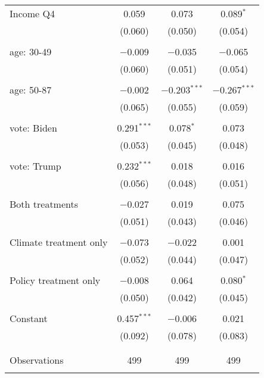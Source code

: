 \begin{tabular}{@{\extracolsep{5pt}}lccc}
 Income Q4 & 0.059 & 0.073 & 0.089$^{*}$ \\ 
  & (0.060) & (0.050) & (0.054) \\ 
  & & & \\ 
 age: 30-49 & $-$0.009 & $-$0.035 & $-$0.065 \\ 
  & (0.060) & (0.051) & (0.054) \\ 
  & & & \\ 
 age: 50-87 & $-$0.002 & $-$0.203$^{***}$ & $-$0.267$^{***}$ \\ 
  & (0.065) & (0.055) & (0.059) \\ 
  & & & \\ 
 vote: Biden & 0.291$^{***}$ & 0.078$^{*}$ & 0.073 \\ 
  & (0.053) & (0.045) & (0.048) \\ 
  & & & \\ 
 vote: Trump & 0.232$^{***}$ & 0.018 & 0.016 \\ 
  & (0.056) & (0.048) & (0.051) \\ 
  & & & \\ 
 Both treatments & $-$0.027 & 0.019 & 0.075 \\ 
  & (0.051) & (0.043) & (0.046) \\ 
  & & & \\ 
 Climate treatment only & $-$0.073 & $-$0.022 & 0.001 \\ 
  & (0.052) & (0.044) & (0.047) \\ 
  & & & \\ 
 Policy treatment only & $-$0.008 & 0.064 & 0.080$^{*}$ \\ 
  & (0.050) & (0.042) & (0.045) \\ 
  & & & \\ 
 Constant & 0.457$^{***}$ & $-$0.006 & 0.021 \\ 
  & (0.092) & (0.078) & (0.083) \\ 
  & & & \\ 
\hline \\[-1.8ex] 

Observations & 499 & 499 & 499 \\ 
\hline 
\hline \\[-1.8ex] 
\end{tabular} 